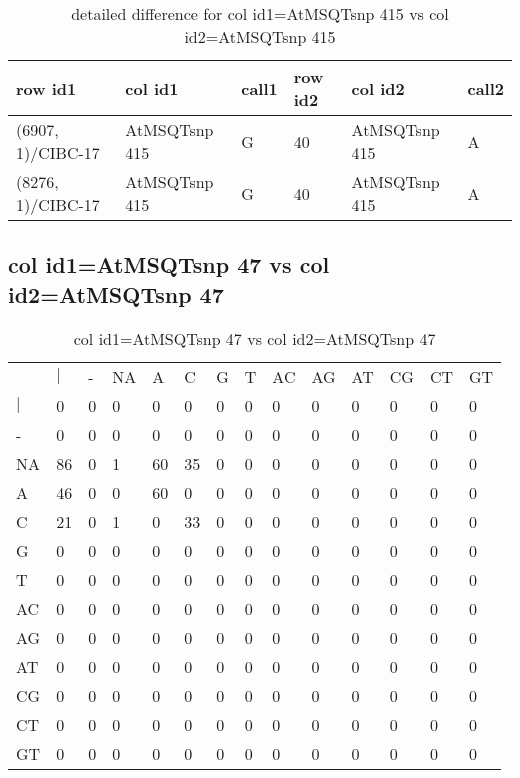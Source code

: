 \begin{center}
\begin{longtable}{|l|l|l|l|l|l|}
\caption{detailed difference for col id1=AtMSQTsnp 415 vs col id2=AtMSQTsnp 415} \label{table_dm935}\\
\hline
row id1&col id1&call1&row id2&col id2&call2\\
\hline
(6907, 1)/CIBC-17&AtMSQTsnp 415&G&40&AtMSQTsnp 415&A\\
(8276, 1)/CIBC-17&AtMSQTsnp 415&G&40&AtMSQTsnp 415&A\\
\hline
\end{longtable}
\end{center}

\subsection{col id1=AtMSQTsnp 47 vs col id2=AtMSQTsnp 47}
\begin{center}
\begin{longtable}{|l|l|l|l|l|l|l|l|l|l|l|l|l|l|}
\caption{col id1=AtMSQTsnp 47 vs col id2=AtMSQTsnp 47} \label{table_dm936}\\
\hline
\\
\hline
&$|$&-&NA&A&C&G&T&AC&AG&AT&CG&CT&GT\\
$|$&0&0&0&0&0&0&0&0&0&0&0&0&0\\
-&0&0&0&0&0&0&0&0&0&0&0&0&0\\
NA&86&0&1&60&35&0&0&0&0&0&0&0&0\\
A&46&0&0&60&0&0&0&0&0&0&0&0&0\\
C&21&0&1&0&33&0&0&0&0&0&0&0&0\\
G&0&0&0&0&0&0&0&0&0&0&0&0&0\\
T&0&0&0&0&0&0&0&0&0&0&0&0&0\\
AC&0&0&0&0&0&0&0&0&0&0&0&0&0\\
AG&0&0&0&0&0&0&0&0&0&0&0&0&0\\
AT&0&0&0&0&0&0&0&0&0&0&0&0&0\\
CG&0&0&0&0&0&0&0&0&0&0&0&0&0\\
CT&0&0&0&0&0&0&0&0&0&0&0&0&0\\
GT&0&0&0&0&0&0&0&0&0&0&0&0&0\\
\hline
\end{longtable}
\end{center}

